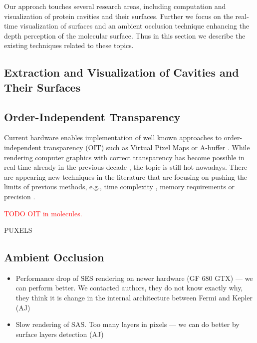 Our approach touches several research areas, including computation and visualization of protein cavities and their surfaces. 
Further we focus on the real-time visualization of surfaces and an ambient occlusion technique enhancing the depth perception of the molecular surface. 
Thus in this section we describe the existing techniques related to these topics.

\subsection{Extraction and Visualization of Cavities and Their Surfaces}
\cite{totrov1996contour}
\cite{krone2009interactive}
\cite{lindow2010accelerated}
\cite{parulek2012implicit}
\cite{connolly1983analytical}


\subsection{Order-Independent Transparency}
Current hardware enables implementation of well known approaches to order-independent transparency (OIT) such as Virtual Pixel Maps \cite{mammen1989transparency} or A-buffer \cite{carpenter1984abuffer}.
While rendering computer graphics with correct transparency has become possible in real-time already in the previous decade \cite{everitt2001interactive}, the topic is still hot nowadays.
There are appearing new techniques in the literature that are focusing on pushing the limits of previous methods, e.g., time complexity \cite{bavoil2008order}, memory requirements \cite{maule2012memory} \cite{vasilakis2015k+buffer} or precision \cite{enderton2011stochastic}.

\textcolor{red}{TODO OIT in molecules.}

\cite{yang2010real}
\cite{salvi2011adaptive}
PUXELS \cite{kauker2013rendering}


\subsection{Ambient Occlusion}
\cite{tarini2006ambient}
\cite{grottel2012object}
\cite{staib2015ambient} 
\cite{borland2011ambient}




\begin{itemize}
  \item Performance drop of SES rendering on newer hardware (GF 680 GTX) --- we can perform better. We contacted authors, they do not know exactly why, they think it is change in the internal architecture between Fermi and Kepler (AJ)
  \item Slow rendering of SAS. Too many layers in pixels --- we can do better by surface layers detection (AJ)
\end{itemize}

